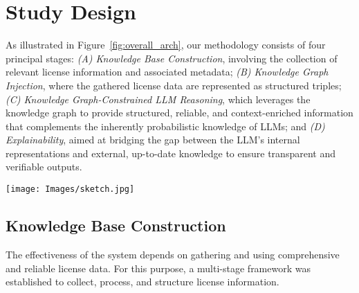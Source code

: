 


\vspace{-.2cm}
\section{Study Design}
\label{Section:Methodology}

As illustrated in Figure~\ref{fig:overall_arch}, our methodology consists of four principal stages:  \textit{(A) Knowledge Base Construction}, involving the collection of relevant license information and associated metadata;  \textit{(B) Knowledge Graph Injection}, where the gathered license data are represented as structured triples;  \textit{(C) Knowledge Graph-Constrained LLM Reasoning}, which leverages the knowledge graph to provide structured, reliable, and context-enriched information that complements the inherently probabilistic knowledge of LLMs; and  \textit{(D) Explainability}, aimed at bridging the gap between the LLM’s internal representations and external, up-to-date knowledge to ensure transparent and verifiable outputs.


\begin{figure*}[!t]
    \centering
    \texttt{[image: Images/sketch.jpg]}
    \caption{Sketch of the proposed KG-RAG framework.} 
    \label{fig:overall_arch}
\end{figure*}


\subsection{Knowledge Base Construction}
\label{sec:Knowledge_Base_Construction}

The effectiveness of the system depends on gathering and using comprehensive and reliable license data. For this purpose, a multi-stage framework was established to collect, process, and structure license information.

